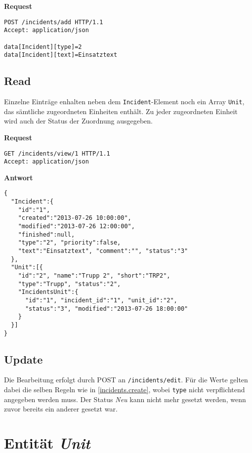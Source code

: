 \documentclass[a4paper,11pt]{article}
\newenvironment{code}[1][]{\smallskip\noindent\textbf{#1}}{}
\begin{document}
\begin{code}[Request]
\begin{lstlisting}
POST /incidents/add HTTP/1.1
Accept: application/json

data[Incident][type]=2
data[Incident][text]=Einsatztext
\end{lstlisting}
\end{code}

\subsection{Read}\label{incidents.read}

Einzelne Einträge enhalten neben dem \texttt{Incident}-Element noch ein Array \texttt{Unit}, das sämtliche zugeordneten Einheiten enthält. Zu jeder zugeordneten Einheit wird auch der Status der Zuordnung ausgegeben.

\begin{code}[Request]
\begin{lstlisting}
GET /incidents/view/1 HTTP/1.1
Accept: application/json
\end{lstlisting}
\end{code}
\begin{code}[Antwort]
\begin{lstlisting}
{
  "Incident":{
    "id":"1",
    "created":"2013-07-26 10:00:00",
    "modified":"2013-07-26 12:00:00",
    "finished":null,
    "type":"2", "priority":false,
    "text":"Einsatztext", "comment":"", "status":"3"
  },
  "Unit":[{
    "id":"2", "name":"Trupp 2", "short":"TRP2",
    "type":"Trupp", "status":"2",
    "IncidentsUnit":{
      "id":"1", "incident_id":"1", "unit_id":"2",
      "status":"3", "modified":"2013-07-26 18:00:00"
    }
  }]
}
\end{lstlisting}
\end{code}

\subsection{Update}\label{incidents.update}

Die Bearbeitung erfolgt durch POST an \texttt{/incidents/edit}. Für die Werte gelten dabei die selben Regeln wie in \ref{incidents.create}, wobei \texttt{type} nicht verpflichtend angegeben werden muss. Der Status \emph{Neu} kann nicht mehr gesetzt werden, wenn zuvor bereits ein anderer gesetzt war.

\section{Entität \emph{Unit}}
\end{document}
